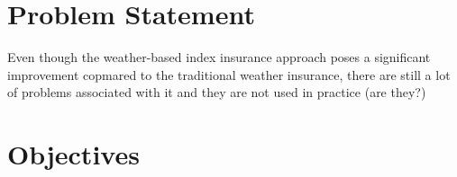 \section{Problem Statement}\label{section:problem_statement}
Even though the weather-based index insurance approach poses a significant improvement copmared to the traditional weather insurance, there are still a lot of problems associated with it and they are not used in practice (are they?)

\section{Objectives}\label{section:objectives}

